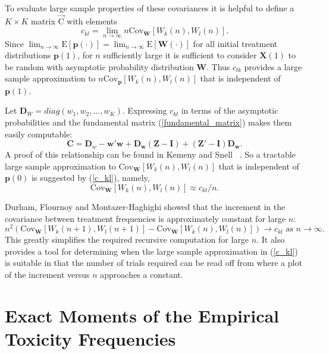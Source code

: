 To evaluate large sample properties of these covariances it is
helpful to define a $K\times K$ matrix $\vec{\textrm{C}}$ with elements
\begin{equation*}\label{c_kl}
c_{kl}=\lim_{n\rightarrow\infty}n\textrm{Cov}_{\mathbf{W}}\left[W_k(n),W_l(n)\right].
\end{equation*}
Since
$\lim_{n\rightarrow\infty}\mathrm{E}[{\mathbf{p}}(\cdot)]=\lim_{n\rightarrow\infty}
\mathrm{E}[{\mathbf{W}}(\cdot)]$
for all initial treatment distributions ${\mathbf{p}(1)}$, for $n$
sufficiently large it is sufficient to consider $\mathbf{X}(1)$ to be
random with asymptotic probability distribution $\mathbf{W}$.  Thus
$c_{lk}$ provides a large sample approximation to
$n\textrm{Cov}_{\mathbf{p}}\left[W_k(n),W_l(n)\right]$ that is
independent of $\mathbf{p}(1)$.

Let $\mathbf{D}_W=diag\left(w_1,w_2,\ldots,w_K\right)$.  Expressing
$c_{kl}$ in terms of the asymptotic probabilities and the
fundamental matrix (\ref{fundamental_matrix}) makes them easily
computable:
\begin{equation*}
\mathbf{C}=\mathbf{D}_w-\mathbf{w}'\mathbf{w}
+\mathbf{D}_{\mathbf{w}}(\mathbf{Z}-\mathbf{I})
+(\mathbf{Z}'-\mathbf{I})\mathbf{D}_{\mathbf{w}}.
\end{equation*}
A proof of this relationship can be found in Kemeny and Snell
~\cite{Keme:Snel:1960}.  So a tractable large sample
approximation to $\textrm{Cov}_{\mathbf{W}}\left[W_k(n),W_l(n)\right]$ that is
independent of $\mathbf{p}(0)$ is suggested by (\ref{c_kl}), namely,
$$\textrm{Cov}_{\mathbf{W}}\left[W_k(n),W_l(n)\right]\approx {c_{kl}}/n.$$


Durham, Flournoy and Montazer-Haghighi \cite{Durh:Flou:Mont:up-a:1993} showed that the
increment in the covariance between treatment frequencies is
approximately constant for large $n$:
\begin{equation}
n^2\left(\textrm{Cov}_{\mathbf{W}}\left[W_k(n+1),W_l(n+1)\right]
-\textrm{Cov}_{\mathbf{W}}\left[W_k(n),W_l(n)\right]\right)
\rightarrow c_{kl} \textrm{ as $n \rightarrow \infty$}.
\end{equation}
This greatly simplifies the required recursive computation for
large $n$.  It also provides a tool for determining when the large
sample approximation in (\ref{c_kl}) is suitable in that the
number of trials required can be read off from where a plot of the
increment versus $n$ approaches a constant.

\section{Exact Moments of the Empirical Toxicity Frequencies}

